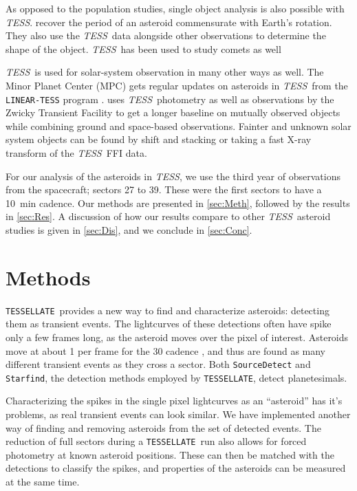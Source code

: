 \documentclass[12pt]{article}
\newcommand{\ttt}{\texttt}
\newcommand{\tess}{\textit{TESS}}
\newcommand{\tessellate}{\texttt{TESSELLATE}}
\begin{document}
As opposed to the population studies, single object analysis is also possible with \tess.
\citet{Humes2024} recover the period of an asteroid commensurate with Earth's rotation.
They also use the \tess\ data alongside other observations to determine the shape of the object.
\tess\ has been used to study comets as well \citep[e.g.][]{Ridden-Harper2021b}

\tess\ is used for solar-system observation in many other ways as well.
The Minor Planet Center (MPC) gets regular updates on asteroids in \tess\ from the \ttt{LINEAR-TESS} program \citep{Woods2021}.
\citet{Gowanlock2024} uses \tess\ photometry as well as observations by the Zwicky Transient Facility \citep[ZTF, ][]{Bellm2019} to get a longer baseline on mutually observed objects while combining ground and space-based observations.
Fainter and unknown solar system objects can be found by shift and stacking \citep{Holman2019, Payne2019, Rice2020} or taking a fast X-ray transform \citep{Nguyen2024} of the \tess\ FFI data.

For our analysis of the asteroids in \tess, we use the third year of observations from the spacecraft; sectors 27 to 39.
These were the first sectors to have a \qty{10}{\minute} cadence.
Our methods are presented in \autoref{sec:Meth}, followed by the results in \autoref{sec:Res}.
A discussion of how our results compare to other \tess\ asteroid studies is given in \autoref{sec:Dis}, and we conclude in \autoref{sec:Conc}.

\section{Methods}\label{sec:Meth}

\tessellate\ provides a new way to find and characterize asteroids: detecting them as transient events.
The lightcurves of these detections often have spike only a few frames long, as the asteroid moves over the pixel of interest.
Asteroids move at about \qty{1}{\px} per frame for the \qty{30}{\min} cadence \citep{Pal2018}, and thus are found as many different transient events as they cross a sector.
Both \ttt{SourceDetect} and \ttt{Starfind}, the detection methods employed by \tessellate, detect planetesimals.

Characterizing the spikes in the single pixel lightcurves as an ``asteroid'' has it's problems, as real transient events can look similar.
We have implemented another way of finding and removing asteroids from the set of detected events.
The reduction of full sectors during a \tessellate\ run also allows for forced photometry at known asteroid positions.
These can then be matched with the detections to classify the spikes, and properties of the asteroids can be measured at the same time.
\end{document}
